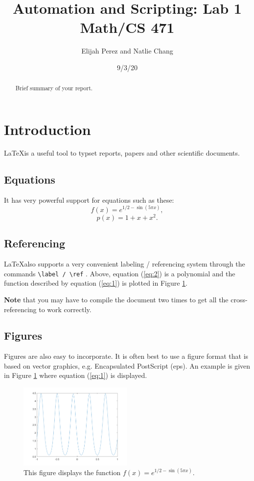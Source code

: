 \documentclass[12pt]{article}
\title{Automation and Scripting: Lab 1 Math/CS 471}
\author{Elijah Perez and Natlie Chang}
\date{9/3/20}   %
\begin{document}
\maketitle

\begin{abstract}
Brief summary of your report.
\end{abstract}
\section{Introduction}
\LaTeX is a useful tool to typset reports, papers and other
scientific documents. 

\subsection{Equations}
It has very powerful support for equations such
as these:
\begin{equation}
f(x) = e^{1/2 - \sin(5 \pi    x)}, \label{eq:1} 
\end{equation}
\begin{equation}
p(x) = 1+x+x^2. \label{eq:2} 
\end{equation}

\subsection{Referencing}
\LaTeX also supports a very convenient labeling / referencing system
through the commands \verb+\label / \ref+ . Above, equation
(\ref{eq:2}) is a polynomial and the function described by equation
(\ref{eq:1}) is plotted in Figure \ref{fig:1}. 

{\bf Note} that you may have to compile the document two times to get
all the cross-referencing to work correctly.

\subsection{Figures}
Figures are also easy to incorporate. It is often best to use a figure
format that is based on vector graphics, e.g. Encapsulated PostScript
(eps). An example is given in Figure \ref{fig:1} where equation
(\ref{eq:1}) is displayed.

\begin{figure}[htb]
\begin{center}
\includegraphics[width=0.5\textwidth]{lab1_.png}
\caption{This figure displays the function $f(x) = e^{1/2 - \sin(5 \pi
    x)}$. \label{fig:1}}
\end{center}
\end{figure}
\end{document}
